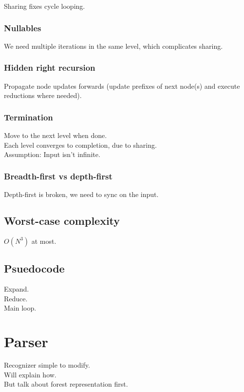 \documentclass[a4paper,10pt]{article}
\begin{document}
Sharing fixes cycle looping.

\subsubsection{Nullables}

We need multiple iterations in the same level, which complicates sharing.

\subsubsection{Hidden right recursion}

Propagate node updates forwards (update prefixes of next node(s) and execute reductions where needed).

\subsubsection{Termination}

Move to the next level when done.\\
Each level converges to completion, due to sharing.\\
Assumption: Input isn't infinite.

\subsubsection{Breadth-first vs depth-first}

Depth-first is broken, we need to sync on the input.

\subsection{Worst-case complexity}

$O(N^3)$ at most.

\subsection{Psuedocode}

Expand.\\
Reduce.\\
Main loop.

\section{Parser}

Recognizer simple to modify.\\
Will explain how.\\
But talk about forest representation first.
\end{document}
